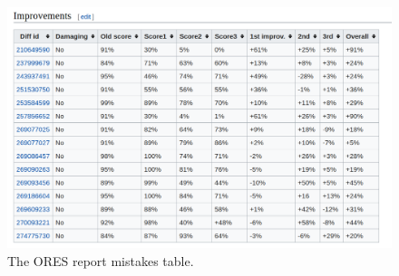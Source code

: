 \begin{figure}[h]
  \centering
  \includegraphics[width=.50\textwidth]{figures/ORES_report_mistakes_table}
  \caption{The ORES report mistakes table.}
  \label{fig:ores_report_mistakes}
\end{figure}
